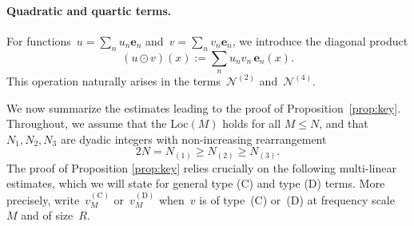\documentclass[11pt,reqno,english]{amsart}
\numberwithin{equation}{section}
\theoremstyle{plain}
\theoremstyle{definition}
\theoremstyle{remark}
\newcommand{\dotcirc}{\mathbin{\odot}}
\begin{document}
\paragraph{\bf Quadratic and quartic terms.}
For functions~$u=\sum_{n}u_n\mathbf{e}_n$ and~$v=\sum_{n}v_n\mathbf{e}_n$, we introduce the diagonal product
\begin{equation}
	\label{def:dotcirc}
	(u\dotcirc v)(x):=\sum_{n}u_nv_n\,\mathbf{e}_n(x).
\end{equation}
This operation naturally arises in the terms~$\mathcal{N}^{(2)}$ and~$\mathcal{N}^{(4)}$.

We now summarize the estimates leading to the proof of Proposition~\ref{prop:key}.
Throughout, we assume that the Loc$(M)$ holds for all $M\leq N$, and that~$N_1,N_2,N_3$ are dyadic integers with non-increasing rearrangement
\[
2N=N_{(1)}\geq N_{(2)}\geq N_{(3)}.
\]
The proof of Proposition \ref{prop:key} relies crucially on the following multi-linear estimates, which we will state for general type (C) and type (D) terms.
More precisely, write~$v_M^{(\mathrm{C})}$ or~$v_M^{(\mathrm{D})}$ when~$v$ is of type~(C) or~(D) at frequency scale~$M$ and of size~$R$.
\end{document}
